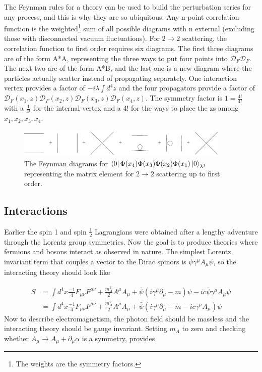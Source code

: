 The Feynman rules for a theory can be used to build the perturbation series for any process, and this is why they are so ubiquitous. Any n-point correlation function is the weighted\footnote{The weights are the symmetry factors.} sum of all possible diagrams with n external (excluding those with disconnected vacuum fluctuations). For $2 \rightarrow 2$ scattering, the correlation function to first order requires six diagrams. The first three diagrams are of the form A*A, representing the three ways to put four points into $\mathcal{D}_F\mathcal{D}_F$. The next two are of the form A*B, and the last one is a new diagram where the particles actually scatter instead of propagating separately. One interaction vertex provides a factor of $-i\lambda\int d^4z$ and the four propagators provide a factor of $\mathcal{D}_F(x_1,z)\mathcal{D}_F(x_2,z)\mathcal{D}_F(x_3,z)\mathcal{D}_F(x_4,z)$. The symmetry factor is $1 = \frac{4!}{4!}$ with a $\frac{1}{4!}$ for the internal vertex and a 4! for the ways to place the zs among $x_1, x_2, x_3, x_4$.

\begin{figure}[h!]
  \centering
  \includegraphics[width=4in]{images/phi4_2-2_scattering.pdf}
  \caption
   {The Feynman diagrams for $\bra{0}\Phi(x_4)\Phi(x_3)\Phi(x_2)\Phi(x_1)\ket{0}_{\lambda^1}$ representing the matrix element for $2\rightarrow 2$ scattering up to first order.}
  \label{fig:feyn2-2}
\end{figure}

\subsection{Interactions}

Earlier the spin 1 and spin $\frac{1}{2}$ Lagrangians were obtained after a lengthy adventure through the Lorentz group symmetries. Now the goal is to produce theories where fermions and bosons interact as observed in nature. The simplest Lorentz invariant term that couples a vector to the Dirac spinors is $\bar{\psi}\gamma^\mu A_\mu \psi$, so the interacting theory should look like 

\begin{equation}
\begin{split}
S &= \int d^4x \frac{-1}{4}F_{\mu\nu}F^{\mu\nu} + \frac{m_A^2}{2} A^\mu A_\mu + \bar{\psi}\left(i\gamma^\mu\partial_\mu - m\right)\psi - ic\bar{\psi}\gamma^\mu A_\mu \psi \\
&= \int d^4x \frac{-1}{4}F_{\mu\nu}F^{\mu\nu} + \frac{m_A^2}{2} A^\mu A_\mu + \bar{\psi}\left(i\gamma^\mu\partial_\mu - m - ic\gamma^\mu A_\mu\right)\psi 
\end{split}
\end{equation}
Now to describe electromagnetism, the photon field should be massless and the interacting theory should be gauge invariant. Setting $m_A$ to zero and checking whether $A_\mu \rightarrow A_\mu + \partial_\mu\alpha$ is a symmetry, provides  


